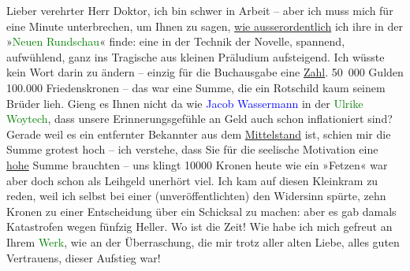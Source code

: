 \pstart
           Lieber verehrter Herr Doktor, ich bin schwer in Arbeit – aber ich
               muss mich für eine Minute unterbrechen, um Ihnen zu sagen, \uline{wie ausserordentlich} ich ihre \label{K_L03669-1v}\label{K_L03669-1h} in der »\textcolor{green}{Neuen
                  Rundschau}{}\ledrightnote{\textcolor{green}{Die neue Rundschau}}« finde: eine \label{K_L03669-2v}\label{K_L03669-2h} in der Technik der Novelle, spannend,
               aufwühlend, ganz ins Tragische aus kleinen Präludium aufsteigend. Ich wüsste kein
               Wort darin zu ändern – einzig für die Buchausgabe eine \uline{Zahl}. 50 000 Gulden 100.000 Friedenskronen – das war eine Summe, die ein
               Rotschild kaum seinem Brüder \label{K_L03669-3v}\label{K_L03669-3h} lieh. Gieng es Ihnen nicht da wie \textcolor{blue}{Jacob Wassermann}{}\ledrightnote{\textcolor{blue}{Jakob Wassermann}} in der \textcolor{green}{Ulrike Woytech}{}\ledrightnote{\textcolor{green}{Ulrike Woytich. Roman}}, dass unsere Erinnerungsgefühle an Geld auch
               schon inflationiert sind? Gerade weil es ein entfernter Bekannter aus dem \uline{Mittelstand} ist, schien mir die Summe grotest hoch –
               ich verstehe, dass {\pb}Sie für die seelische
               Motivation eine \uline{hohe} Summe brauchten – uns klingt
               10000 Kronen heute wie ein »Fetzen« war aber doch schon als Leihgeld unerhört viel.
               Ich kam auf diesen Kleinkram zu reden, weil ich selbst bei einer (unveröffentlichten)
                  \label{K_L03669-4v}\label{K_L03669-4h} den Widersinn spürte, zehn Kronen zu einer Entscheidung über
               ein Schicksal zu machen: aber es gab damals Katastrofen wegen fünfzig Heller. Wo ist
               die Zeit! Wie habe ich mich gefreut an Ihrem \textcolor{green}{Werk}{}\ledrightnote{{$\rightarrow$}\textcolor{green}{Fräulein Else}}, wie an der Überraschung, die mir trotz aller alten
               Liebe, alles guten Vertrauens, dieser Aufstieg war!\pend
           
